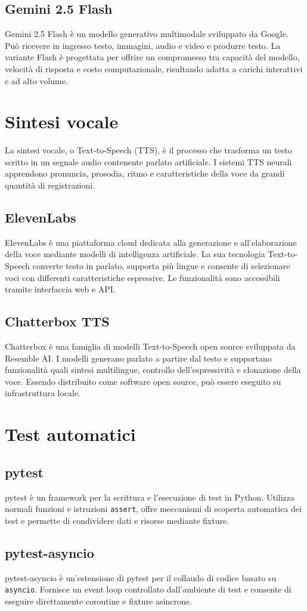 \subsection{Gemini 2.5 Flash}
Gemini 2.5 Flash è un modello generativo multimodale sviluppato da Google. Può
ricevere in ingresso testo, immagini, audio e video e produrre testo. La
variante Flash è progettata per offrire un compromesso tra capacità del
modello, velocità di risposta e costo computazionale, risultando adatta a
carichi interattivi e ad alto volume.

\section{Sintesi vocale}

La sintesi vocale, o Text-to-Speech (TTS), è il processo che trasforma un testo
scritto in un segnale audio contenente parlato artificiale. I sistemi TTS
neurali apprendono pronuncia, prosodia, ritmo e caratteristiche della voce da
grandi quantità di registrazioni.

\subsection{ElevenLabs}
ElevenLabs è una piattaforma cloud dedicata alla generazione e all'elaborazione
della voce mediante modelli di intelligenza artificiale. La sua tecnologia
Text-to-Speech converte testo in parlato, supporta più lingue e consente di
selezionare voci con differenti caratteristiche espressive. Le funzionalità
sono accessibili tramite interfaccia web e API.

\subsection{Chatterbox TTS}
Chatterbox è una famiglia di modelli Text-to-Speech open source sviluppata da
Resemble AI. I modelli generano parlato a partire dal testo e supportano
funzionalità quali sintesi multilingue, controllo dell'espressività e
clonazione della voce. Essendo distribuito come software open source, può
essere eseguito su infrastruttura locale.

\section{Test automatici}

\subsection{pytest}
pytest è un framework per la scrittura e l'esecuzione di test in Python.
Utilizza normali funzioni e istruzioni \texttt{assert}, offre meccanismi di
scoperta automatica dei test e permette di condividere dati e risorse mediante
fixture.

\subsection{pytest-asyncio}
pytest-asyncio è un'estensione di pytest per il collaudo di codice basato su
\texttt{asyncio}. Fornisce un event loop controllato dall'ambiente di test e
consente di eseguire direttamente coroutine e fixture asincrone.
